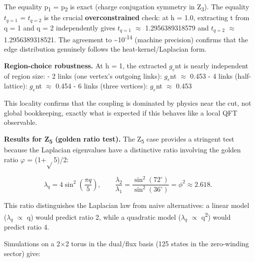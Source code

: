 \documentclass[11pt,a4paper]{article}
\theoremstyle{remark}
\begin{document}
The equality p\textsubscript{1} = p\textsubscript{2} is exact (charge conjugation symmetry in Z\textsubscript{3}).
The equality \(t_{q=1}\) = \(t_{q=2}\) is the crucial \textbf{overconstrained} check: at
h = 1.0, extracting t from q = 1 and q = 2 independently gives
\(t_{q=1}\) \ensuremath{\approx} 1.2956389318579 and \(t_{q=2}\) \ensuremath{\approx} 1.2956389318521. The
agreement to \textasciitilde10\textsuperscript{-14} (machine precision) confirms that the edge
distribution genuinely follows the heat-kernel/Laplacian form.

\textbf{Region-choice robustness.} At h = 1, the extracted \(g_e\)nt
is nearly independent of region size:
- 2 links (one vertex's outgoing links): \(g_e\)nt \ensuremath{\approx} 0.453
- 4 links (half-lattice): \(g_e\)nt \ensuremath{\approx} 0.454
- 6 links (three vertices): \(g_e\)nt \ensuremath{\approx} 0.453

This locality confirms that the coupling is dominated by physics near the cut,
not global bookkeeping, exactly what is expected if this behaves like a local
QFT observable.

\textbf{Results for Z\textsubscript{5} (golden ratio test).} The Z\textsubscript{5} case
provides a stringent test because the Laplacian eigenvalues have a distinctive
ratio involving the golden ratio \ensuremath{\varphi} = (1+\ensuremath{\sqrt{}}5)/2:

\[
\lambda_q = 4\sin^2\left(\frac{\pi q}{5}\right), \qquad
\frac{\lambda_2}{\lambda_1} = \frac{\sin^2(72^\circ)}{\sin^2(36^\circ)} = \phi^2 \approx 2.618.
\]

This ratio distinguishes the Laplacian law from naive alternatives: a linear
model (\(\ensuremath{\lambda}_q\) \ensuremath{\propto} q) would predict ratio 2, while a quadratic model
(\(\ensuremath{\lambda}_q\) \ensuremath{\propto} q\textsuperscript{2}) would predict ratio 4.

Simulations on a 2\ensuremath{\times}2 torus in the dual/flux basis (125 states in the
zero-winding sector) give:
\end{document}
